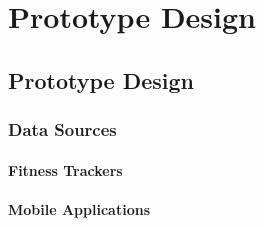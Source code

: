 \chapter{Prototype Design}
\label{ch:proto}
\section{Prototype Design}
\subsection{Data Sources}
\subsubsection{Fitness Trackers}
\subsubsection{Mobile Applications}

